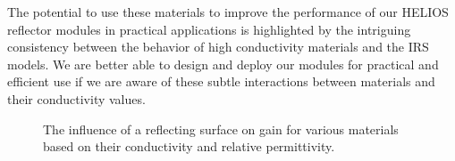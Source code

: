 The potential to use these materials to improve the performance of our HELIOS reflector modules in practical applications is highlighted by the intriguing consistency between the behavior of high conductivity materials and the IRS models. We are better able to design and deploy our modules for practical and efficient use if we are aware of these subtle interactions between materials and their conductivity values.

\begin{figure}[H]
	\centering
	\hfill
	\caption[The influence of a reflecting surface on gain for various materials based on their conductivity and relative permittivity.]{The influence of a reflecting surface on gain for various materials based on their conductivity and relative permittivity.}
	\label{}
\end{figure}
